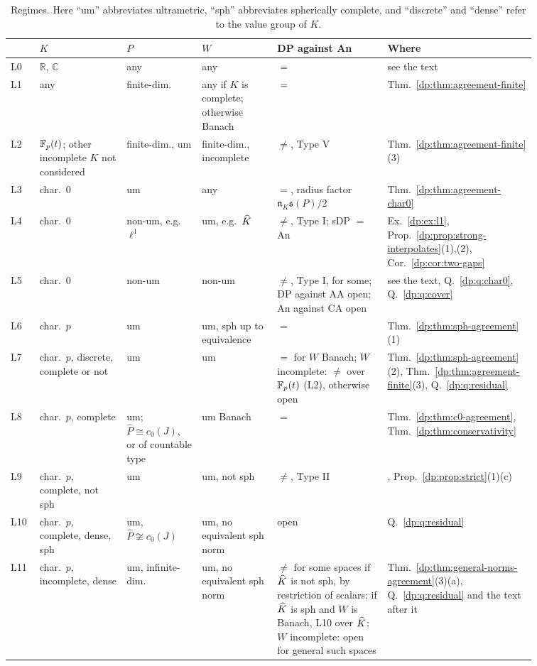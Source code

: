 \begin{table}[htbp]
\footnotesize
\caption{Regimes. Here ``um'' abbreviates ultrametric, ``sph'' abbreviates spherically complete, and ``discrete'' and ``dense'' refer to the value group of $K$.}\label{dp:tab:ledger}
\begin{tabular}{@{}p{0.05\linewidth}p{0.155\linewidth}p{0.135\linewidth}p{0.135\linewidth}p{0.195\linewidth}p{0.185\linewidth}@{}}
 & $K$ & $P$ & $W$ & DP against An & Where\\
\hline
L0 & $\mathbb R$, $\mathbb C$ & any & any & $=$ & see the text\\
L1 & any & finite-dim. & any if $K$ is complete; otherwise Banach & $=$ & Thm.~\ref{dp:thm:agreement-finite}\\
L2 & $\mathbb F_p(t)$; other incomplete $K$ not considered & finite-dim., um & finite-dim., incomplete & $\ne$, Type V & Thm.~\ref{dp:thm:agreement-finite}(3)\\
L3 & char.\ $0$ & um & any & $=$, radius factor $\mathfrak n_K\mathfrak s(P)/2$ & Thm.~\ref{dp:thm:agreement-char0}\\
L4 & char.\ $0$ & non-um, e.g.\ $\ell^1$ & um, e.g.\ $\widehat K$ & $\ne$, Type I; sDP $=$ An & Ex.~\ref{dp:ex:l1}, Prop.~\ref{dp:prop:strong-interpolates}(1),(2), Cor.~\ref{dp:cor:two-gaps}\\
L5 & char.\ $0$ & non-um & non-um & $\ne$, Type I, for some; DP against AA open; An against CA open & see the text, Q.~\ref{dp:q:char0}, Q.~\ref{dp:q:cover}\\
\hline
L6 & char.\ $p$ & um & um, sph up to equivalence & $=$ & Thm.~\ref{dp:thm:sph-agreement}(1)\\
L7 & char.\ $p$, discrete, complete or not & um & um & $=$ for $W$ Banach; $W$ incomplete: $\ne$ over $\mathbb F_p(t)$ (L2), otherwise open & Thm.~\ref{dp:thm:sph-agreement}(2), Thm.~\ref{dp:thm:agreement-finite}(3), Q.~\ref{dp:q:residual}\\
L8 & char.\ $p$, complete & um; $\widehat P\cong c_0(J)$, or of countable type & um Banach & $=$ & Thm.~\ref{dp:thm:c0-agreement}, Thm.~\ref{dp:thm:conservativity}\\
L9 & char.\ $p$, complete, not sph & um & um, not sph & $\ne$, Type II & \cite[Theorem~7.2(2)]{I}, Prop.~\ref{dp:prop:strict}(1)(c)\\
L10 & char.\ $p$, complete, dense, sph & um, $\widehat P\not\cong c_0(J)$ & um, no equivalent sph norm & open & Q.~\ref{dp:q:residual}\\
L11 & char.\ $p$, incomplete, dense & um, infinite-dim. & um, no equivalent sph norm & $\ne$ for some spaces if $\widehat K$ is not sph, by restriction of scalars; if $\widehat K$ is sph and $W$ is Banach, L10 over $\widehat K$; $W$ incomplete: open for general such spaces & Thm.~\ref{dp:thm:general-norms-agreement}(3)(a), Q.~\ref{dp:q:residual} and the text after it\\

\end{tabular}
\end{table}

